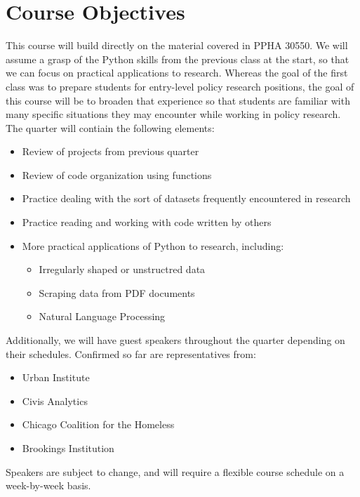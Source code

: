 \documentclass{article}
\begin{document}
\section*{Course Objectives}
This course will build directly on the material covered in PPHA 30550.  We will assume a grasp of the Python skills from the previous class at the start, so that we can focus on practical applications to research.  Whereas the goal of the first class was to prepare students for entry-level policy research positions, the goal of this course will be to broaden that experience so that students are familiar with many specific situations they may encounter while working in policy research.  The quarter will contiain the following elements:

\begin{itemize}
	\item Review of projects from previous quarter
	\item Review of code organization using functions
	\item Practice dealing with the sort of datasets frequently encountered in research
	\item Practice reading and working with code written by others
	\item More practical applications of Python to research, including:
	\begin{itemize}
		\item Irregularly shaped or unstructred data
		\item Scraping data from PDF documents
		\item Natural Language Processing
	\end{itemize}
\end{itemize}

\noindent Additionally, we will have guest speakers throughout the quarter depending on their schedules.  Confirmed so far are representatives from:

\begin{itemize}
	\item Urban Institute
	\item Civis Analytics
	\item Chicago Coalition for the Homeless
	\item Brookings Institution
\end{itemize}

\noindent Speakers are subject to change, and will require a flexible course schedule on a week-by-week basis.

\end{document}
